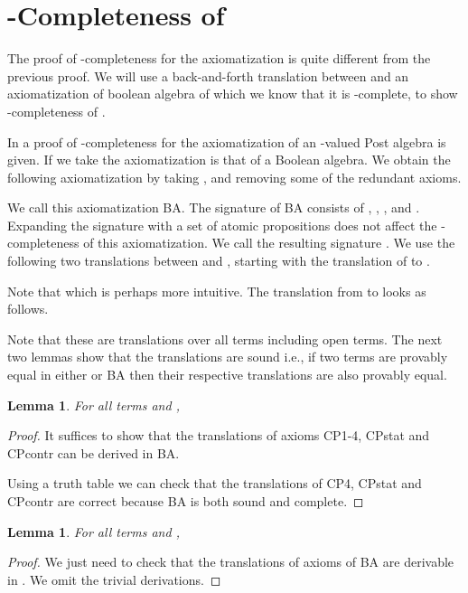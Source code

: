 \documentclass[a4paper,twoside,openright]{report}
\newtheorem{lem}[theorem]{Lemma}
\begin{document}
\section{-Completeness of }

The proof of -completeness for the axiomatization  is quite different from the previous proof. We will use a back-and-forth translation between  and an axiomatization of boolean algebra of which we know that it is -complete, to show -completeness of .

In \cite{omega_bergstra} a proof of -completeness for the axiomatization of an -valued Post algebra is given. If we take  the axiomatization is that of a Boolean algebra. We obtain the following axiomatization by taking , and removing some of the redundant axioms.

We call this axiomatization BA. The signature of BA consists of , , ,  and . Expanding the signature with a set of atomic propositions  does not affect the -completeness of this axiomatization. We call the resulting signature . We use the following two translations between  and , starting with the translation of  to .

Note that  which is perhaps more intuitive. The translation from  to  looks as follows.

Note that these are translations over all terms including open terms. The next two lemmas show that the translations are sound i.e., if two terms are provably equal in either  or BA then their respective translations are also provably equal.
\begin{lem}\label{CPst in BA lem}
For all terms  and ,

\end{lem}
\begin{proof}
It suffices to show that the translations of axioms CP1-4, CPstat and CPcontr can be derived in BA.

Using a truth table we can check that the translations of CP4, CPstat and CPcontr are correct because BA is both sound and complete.
\end{proof}
\begin{lem}\label{BA in CPst lem}
For all terms  and ,

\end{lem}
\begin{proof}
We just need to check that the translations of axioms of BA are derivable in . We omit the trivial derivations.



\end{proof}
\end{document}

